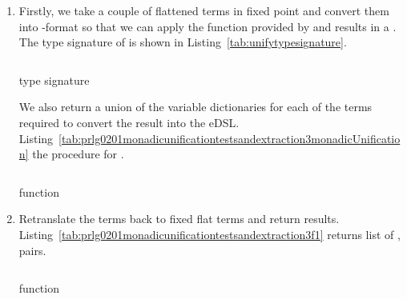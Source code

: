 \documentclass[thesis-solanki.tex]{subfiles}
\begin{document}
\begin{enumerate}
\item{}

  Firstly, we take a couple of flattened terms in fixed point and convert them into -format
so that we can apply the  function provided by  and results
in a . The type signature of  is shown in Listing~\ref{tab:unifytypesignature}.

\begin{code-list}[H]
\begin{singlespace}
\inputminted[linenos]{haskell}{haskell-proto2-unify-type-signature.hs}
\end{singlespace}
\caption{  type signature}
\label{tab:unifytypesignature}
\end{code-list}


We also return a union of the variable dictionaries for each of the terms required to convert the result into the eDSL.
Listing~\ref{tab:prlg0201monadicunificationtestsandextraction3monadicUnification} the procedure for \linebreak[4]
.\sloppy


\begin{code-list}[H]
  \begin{singlespace}
    \inputminted[linenos,firstline=84, lastline=93]{haskell}{haskell-proto2-monadic-unification-tests-and-extraction.hs}
  \end{singlespace}
\caption{ function}
\label{tab:prlg0201monadicunificationtestsandextraction3monadicUnification}
\end{code-list}

\item{}

Retranslate the terms back to fixed flat terms and return results.
Listing~\ref{tab:prlg0201monadicunificationtestsandextraction3f1}
returns list of ,  pairs.

\begin{code-list}[H]
  \begin{singlespace}
    \inputminted[linenos,firstline=109, lastline=119]{haskell}{haskell-proto2-monadic-unification-tests-and-extraction.hs}
  \end{singlespace}
\caption{ function}
\label{tab:prlg0201monadicunificationtestsandextraction3f1}
\end{code-list}



\end{enumerate}
\end{document}
